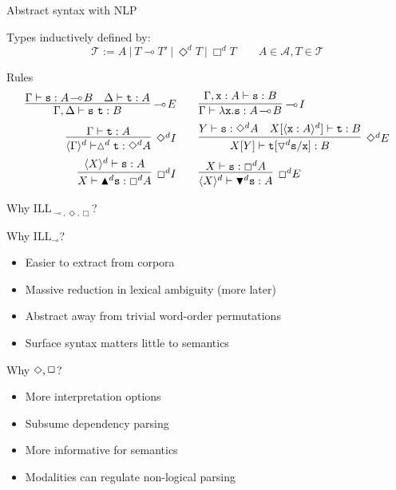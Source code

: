 \documentclass{beamer}
\newcommand{\term}[1]{\ensuremath{\mathtt{#1}}}
\newcommand{\li}{\!\multimap\!}
\begin{document}
\begin{frame}{Abstract syntax with NLP}
{	Types inductively defined by:
	\[
		\mathcal{T} := A \ | \  T \li T' \ | \ \Diamond^d  T \ | \ \Box^d T \qquad A \in \mathcal{A}, T \in \mathcal{T}
	\]
	\vfill	

	\begin{block}{Rules}
	\begin{align*}
		\infer[\li E]{\Gamma, \Delta \vdash \term{s\ t}: B}{\Gamma \vdash \term{s}: A \li B & \Delta \vdash \term{t}: A}
		&\qquad
		\infer[\li I]{\Gamma \vdash \term{\lambda x.s}: A \li B}{\Gamma, \term{x}: A \vdash \term{s}: B} \\
		\infer[\Diamond^d I]{\langle \Gamma \rangle^{d} \vdash \vartriangle^d \term{t}: \Diamond^d A}{\Gamma \vdash \term{t}: A}
		&\qquad
		\infer[\Diamond^d E]{X[Y] \vdash \term{t}[\triangledown^d \term{s}/\term{x}]: B}{
			Y \vdash \term{s}: \Diamond^d A
			&
			X[\langle \term{x}: A \rangle^d] \vdash \term{t}: B} \\
		\infer[\Box^d I]{X \vdash \blacktriangle^d \term{s}: \Box^d A}{\langle X \rangle^d \vdash \term{s}: A}
		&
		\qquad
		\infer[\Box^d E]{\langle X \rangle^d \vdash \blacktriangledown^d \term{s}: A}{X \vdash \term{s}: \Box^d A}
	\end{align*}
	\end{block}
}
\end{frame}

\begin{frame}{Why ILL$_{\li, \Diamond, \Box}$?}
\small
\begin{block}{Why ILL$_{\li}$?}
	\begin{itemize}
	\item Easier to extract from corpora
	\item Massive reduction in lexical ambiguity (more later)
	\item Abstract away from trivial word-order permutations
	\item Surface syntax matters little to semantics
	\end{itemize}
\end{block}

\pause
\begin{block}{Why $\Diamond, \raisebox{1.5pt}{\ensuremath{\Box}}$?}
	\begin{itemize}
	\item More interpretation options
	\item Subsume dependency parsing
	\item More informative for semantics 
	\item Modalities can regulate non-logical parsing
	\end{itemize}
\end{block}
\end{frame}
\end{document}
